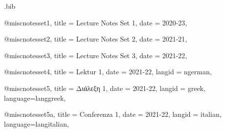 

\begin{filecontents*}[overwrite]{\jobname.bib}

@misc{notesset1,
  title = {Lecture Notes Set 1}, 
  date = {2020-23},
	}

@misc{notesset2,
  title = {Lecture Notes Set 2}, 
  date = {2021-21},
	}

@misc{notesset3,
  title = {Lecture Notes Set 3}, 
  date = {2021-22},
	}	

@misc{notesset4,
  title = {Lektur 1}, 
  date = {2021-22},
  langid = {ngerman},
	}	


@misc{notesset5,
  title = {Διάλεξη 1}, 
  date = {2021-22},
  langid = {greek},
  language={langgreek},
	}	

@misc{notesset5a,
  title = {Conferenza 1}, 
  date = {2021-22},
  langid = {italian},
  language={langitalian},
	}	

\end{filecontents*}




\documentclass[12pt]{article}
\usepackage[english]{babel}
\usepackage{csquotes}
\usepackage[svgnames]{xcolor}
\usepackage{fontspec}
          [Color=DarkGreen ,
          ]{Noto Serif}

\usepackage[style=authoryear,
dateabbrev=false,%
language=autocite,%
autolang=other,%
]{biblatex}




\DeclareCiteCommand{\citeseasonall}
{}
{\textmd{\printlist{language}}
\printfield{title}\addcomma\addspace\printdate}
{}
{}

\DeclareCiteCommand{\citeseasontitle}
{}
{\printfield{title}
}
{}
{}

\DeclareCiteCommand{\citeseason}
{}
{\printdate}
{}
{}







